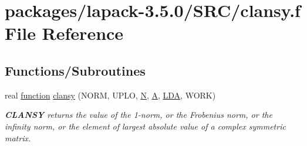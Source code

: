 \hypertarget{clansy_8f}{}\section{packages/lapack-\/3.5.0/\+S\+R\+C/clansy.f File Reference}
\label{clansy_8f}
\subsection*{Functions/\+Subroutines}
\begin{DoxyCompactItemize}
\item 
real \hyperlink{afunc_8m_a7b5e596df91eadea6c537c0825e894a7}{function} \hyperlink{group__complexSYauxiliary_gad2c86a28190eb12c91cda1c4faef5df7}{clansy} (N\+O\+R\+M, U\+P\+L\+O, \hyperlink{polmisc_8c_a0240ac851181b84ac374872dc5434ee4}{N}, \hyperlink{classA}{A}, \hyperlink{example__user_8c_ae946da542ce0db94dced19b2ecefd1aa}{L\+D\+A}, W\+O\+R\+K)
\begin{DoxyCompactList}\small\item\em {\bfseries C\+L\+A\+N\+S\+Y} returns the value of the 1-\/norm, or the Frobenius norm, or the infinity norm, or the element of largest absolute value of a complex symmetric matrix. \end{DoxyCompactList}\end{DoxyCompactItemize}

